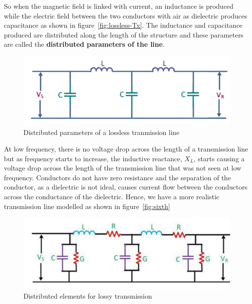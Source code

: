 So when the magnetic field is linked with current, an inductance is produced while the electric field between the two conductors with air as dielectric produces capacitance as shown in figure~\ref{fig:lossless-Tx}. The inductance and capacitance produced are distributed along the length of the structure and these parameters are called the \textbf{distributed parameters of the line}.
\begin{figure}[h]
\centering
\includegraphics[width=1\linewidth]{graphics/transmissionLineLossless}
\caption{Distributed parameters of a lossless tranmission line}
\label{fig:transmissionLineLossless}
\end{figure}

At low frequency, there is no voltage drop across the length of a transmission line but as frequency starts to increase, the inductive reactance, $X_{L}$, starts causing a voltage drop across the length of the transmission line that was not seen at low frequency. Conductors do not have zero resistance and the separation of the conductor, as a dielectric is not ideal, causes current flow between the conductors across the conductance of the dielectric. Hence, we have a more realistic transmission line modelled as shown in figure~\ref{fig:sixth}
\begin{figure}[h]
\centering
\includegraphics[width=1\linewidth]{graphics/transmissionLineLossy}
\caption{Distributed elements for lossy transmission}
\label{fig:transmissionLineLossy}
\end{figure}


